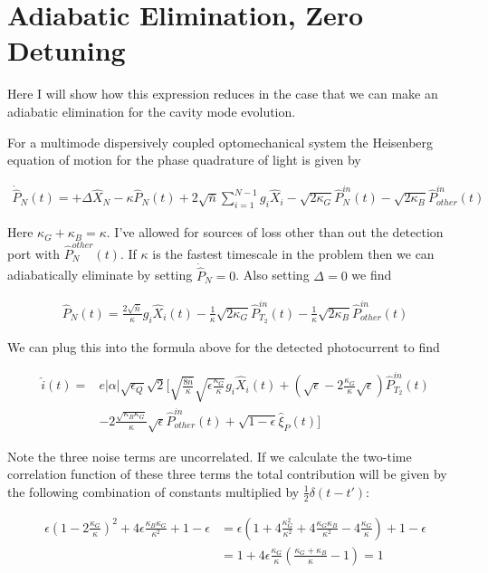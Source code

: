 \documentclass[12pt]{article}
\begin{document}
\section{Adiabatic Elimination, Zero Detuning}

Here I will show how this expression reduces in the case that we can make an adiabatic elimination for the cavity mode evolution.

For a multimode dispersively coupled optomechanical system the Heisenberg equation of motion for the phase quadrature of light is given by

\begin{align}
\dot{\hat{P}}_N(t) = +\Delta \hat{X}_N - \kappa \hat{P}_N(t) + 2 \sqrt{\bar{n}} \sum_{i=1}^{N-1} g_i \hat{X}_i - \sqrt{2\kappa_G} \hat{P}_N^{in}(t) - \sqrt{2\kappa_B}\hat{P}_{other}^{in}(t)
\end{align}

Here $\kappa_G+\kappa_B = \kappa$. I've allowed for sources of loss other than out the detection port with $\hat{P}_N^{other}(t)$. If $\kappa$ is the fastest timescale in the problem then we can adiabatically eliminate by setting $\dot{\hat{P}}_N = 0$. Also setting $\Delta = 0$ we find

\begin{align}
\hat{P}_N(t) = \frac{2\sqrt{\bar{n}}}{\kappa} g_i \hat{X}_i(t) - \frac{1}{\kappa}\sqrt{2\kappa_G}\hat{P}_{T_2}^{in}(t) - \frac{1}{\kappa}\sqrt{2\kappa_B}\hat{P}_{other}^{in}(t)
\end{align}

We can plug this into the formula above for the detected photocurrent to find

\begin{align}
\hat{i}(t) =& e|\alpha|\sqrt{\epsilon_Q}\sqrt{2}\Bigg[\sqrt{\frac{8\bar{n}}{\kappa}}\sqrt{\epsilon\frac{\kappa_G}{\kappa}}g_i \hat{X}_i(t) + \left(\sqrt{\epsilon} - 2\frac{\kappa_G}{\kappa} \sqrt{\epsilon}\right)\hat{P}_{T_2}^{in}(t)\\
&-2\frac{\sqrt{\kappa_B\kappa_G}}{\kappa}\sqrt{\epsilon}\hat{P}_{other}^{in}(t) + \sqrt{1-\epsilon}\hat{\xi}_P(t)\Bigg]
\end{align}

Note the three noise terms are uncorrelated. If we calculate the two-time correlation function of these three terms the total contribution will be given by the following combination of constants multiplied by $\frac{1}{2}\delta(t-t')$:

\begin{align}
\epsilon\left(1-2\frac{\kappa_G}{\kappa}\right)^2 + 4 \epsilon \frac{\kappa_B \kappa_G}{\kappa^2} + 1-\epsilon &= \epsilon \left(1 + 4 \frac{\kappa_G^2}{\kappa^2} + 4 \frac{\kappa_G \kappa_B}{\kappa^2} - 4\frac{\kappa_G}{\kappa} \right) + 1-\epsilon\\
&= 1 + 4\epsilon\frac{\kappa_G}{\kappa}\left(\frac{\kappa_G + \kappa_B}{\kappa} - 1 \right) = 1
\end{align}
\end{document}
